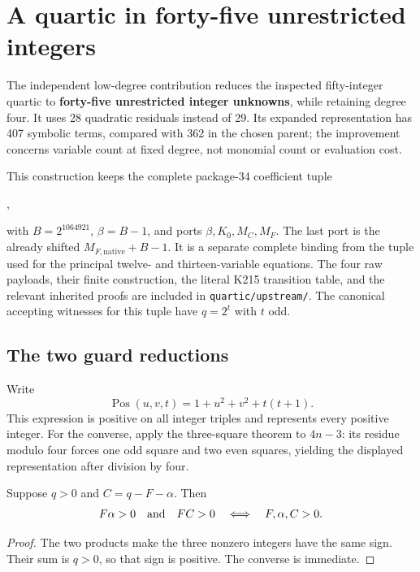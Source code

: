 \section{A quartic in forty-five unrestricted integers}
\label{sec:quartic45}

The independent low-degree contribution reduces the inspected
fifty-integer quartic to \textbf{forty-five unrestricted integer unknowns},
while retaining degree four.  It uses 28 quadratic residuals instead of
29.  Its expanded representation has 407 symbolic terms, compared with
362 in the chosen parent; the improvement concerns variable count at
fixed degree, not monomial count or evaluation cost.

This construction keeps the complete package-34 coefficient tuple
\begin{center},\end{center}
with
\(B=2^{1064921}\), \(\beta=B-1\), and ports
\(\beta,K_0,M_C,M_F\).  The last port is the already shifted
\(M_{F,\mathrm{native}}+B-1\).  It is a separate complete binding from
the tuple used for the principal twelve- and thirteen-variable equations.
The four raw payloads, their finite construction, the literal K215
transition table, and the relevant inherited proofs are included in
\texttt{quartic/upstream/}.  The canonical accepting witnesses for this
tuple have \(q=2^t\) with \(t\) odd.

\subsection{The two guard reductions}

Write
\[
 \operatorname{Pos}(u,v,t)=1+u^2+v^2+t(t+1).
\]
This expression is positive on all integer triples and represents every
positive integer.  For the converse, apply the three-square theorem to
\(4n-3\): its residue modulo four forces one odd square and two even
squares, yielding the displayed representation after division by four.

\begin{lemma}
Suppose \(q>0\) and \(C=q-F-\alpha\).  Then
\[
 F\alpha>0\quad\hbox{and}\quad FC>0
 \quad\Longleftrightarrow\quad F,\alpha,C>0.
\]
\end{lemma}
\begin{proof}
The two products make the three nonzero integers have the same sign.
Their sum is \(q>0\), so that sign is positive.  The converse is immediate.
\end{proof}

